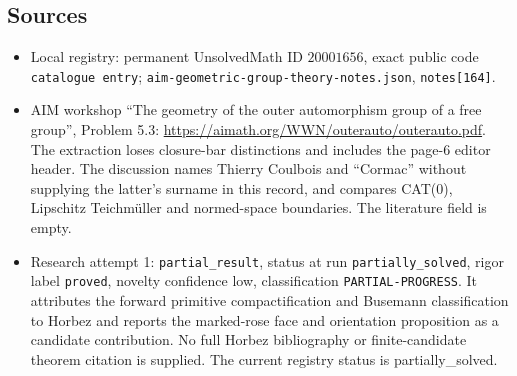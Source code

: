 \documentclass[11pt]{article}
\begin{document}
\subsection{Sources}
\begin{itemize}
\item Local registry: permanent UnsolvedMath ID \(20001656\), exact public code \texttt{catalogue entry}; \texttt{aim-geometric-group-theory-notes.json}, \texttt{notes[164]}.
\item AIM workshop ``The geometry of the outer automorphism group of a free group'', Problem 5.3: \url{https://aimath.org/WWN/outerauto/outerauto.pdf}. The extraction loses closure-bar distinctions and includes the page-6 editor header. The discussion names Thierry Coulbois and ``Cormac'' without supplying the latter's surname in this record, and compares CAT(0), Lipschitz Teichmüller and normed-space boundaries. The literature field is empty.
\item Research attempt 1: \texttt{partial\_result}, status at run \texttt{partially\_solved}, rigor label \texttt{proved}, novelty confidence low, classification \texttt{PARTIAL-PROGRESS}. It attributes the forward primitive compactification and Busemann classification to Horbez and reports the marked-rose face and orientation proposition as a candidate contribution. No full Horbez bibliography or finite-candidate theorem citation is supplied. The current registry status is partially_solved.
\end{itemize}
\end{document}
